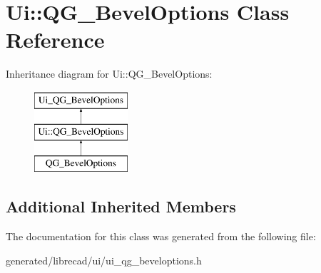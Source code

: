 \hypertarget{classUi_1_1QG__BevelOptions}{\section{Ui\-:\-:Q\-G\-\_\-\-Bevel\-Options Class Reference}
\label{classUi_1_1QG__BevelOptions}
}
Inheritance diagram for Ui\-:\-:Q\-G\-\_\-\-Bevel\-Options\-:\begin{figure}[H]
\begin{center}
\leavevmode
\includegraphics[height=3.000000cm]{classUi_1_1QG__BevelOptions}
\end{center}
\end{figure}
\subsection*{Additional Inherited Members}


The documentation for this class was generated from the following file\-:\begin{DoxyCompactItemize}
\item 
generated/librecad/ui/ui\-\_\-qg\-\_\-beveloptions.\-h\end{DoxyCompactItemize}
